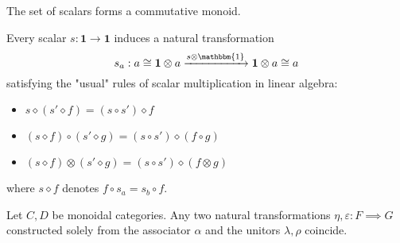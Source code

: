 	\begin{property}
		The set of scalars forms a commutative monoid.
	\end{property}
	\begin{property}
		Every scalar $s:\mathbf{1}\rightarrow\mathbf{1}$ induces a natural transformation \[s_a:a\cong\mathbf{1}\otimes a\xrightarrow{s\otimes\mathbbm{1}}\mathbf{1}\otimes a\cong a\] satisfying the "usual" rules of scalar multiplication in linear algebra:
		\begin{itemize}
			\item $s\diamond(s'\diamond f) = (s\circ s')\diamond f$
			\item $(s\diamond f)\circ(s'\diamond g) = (s\circ s')\diamond(f\circ g)$
			\item $(s\diamond f)\otimes(s'\diamond g) = (s\circ s')\diamond(f\otimes g)$
		\end{itemize}
		where $s\diamond f$ denotes $f\circ s_a = s_b\circ f$.
	\end{property}
	
	\begin{theorem}
		Let $C, D$ be monoidal categories. Any two natural transformations $\eta, \varepsilon:F\implies G$ constructed solely from the associator $\alpha$ and the unitors $\lambda,\rho$ coincide.
	\end{theorem}
	

